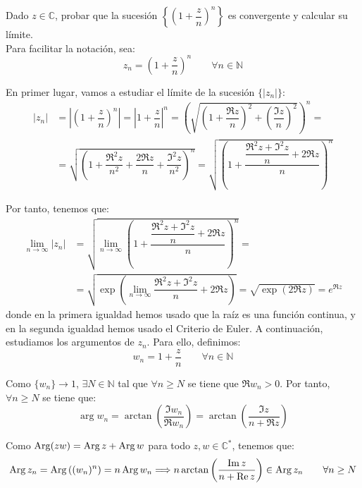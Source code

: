 \begin{ejercicio}
    Dado $z \in \mathbb{C}$, probar que la sucesión $\left\{\left(1 + \dfrac{z}{n}\right)^n\right\}$ es convergente y calcular su límite.\\

    Para facilitar la notación, sea:
    \begin{equation*}
        z_n = \left(1 + \dfrac{z}{n}\right)^n\qquad \forall n\in \mathbb{N}
    \end{equation*}

    En primer lugar, vamos a estudiar el límite de la sucesión $\{|z_n|\}$:
    \begin{align*}
        |z_n| &= \left|\left(1 + \dfrac{z}{n}\right)^n\right| = \left|1 + \dfrac{z}{n}\right|^n = \left(\sqrt{\left(1+\dfrac{\Re z}{n}\right)^2 + \left(\dfrac{\Im z}{n}\right)^2}\right)^n
        =\\&= \sqrt{\left(1 + \dfrac{\Re^2z}{n^2} + \dfrac{2\Re z}{n} + \dfrac{\Im^2 z}{n^2}\right)^{n}}
        = \sqrt{\left(1 + \dfrac{\dfrac{\Re^2z + \Im^2z}{n}+2\Re z}{n}\right)^{n}}
    \end{align*}

    Por tanto, tenemos que:
    \begin{align*}
        \lim_{n\to \infty}|z_n| &= \sqrt{\lim_{n\to \infty}\left(1 + \dfrac{\dfrac{\Re^2z + \Im^2z}{n}+2\Re z}{n}\right)^{n}}
        =\\&= \sqrt{\exp\left(\lim_{n\to \infty}\dfrac{\Re^2z + \Im^2z}{n}+2\Re z\right)}
        = \sqrt{\exp(2\Re z)} = e^{\Re z}
    \end{align*}
    donde en la primera igualdad hemos usado que la raíz es una función continua, y en la segunda igualdad hemos usado el Criterio de Euler. A continuación, estudiamos los argumentos de $z_n$. Para ello, definimos:
    \begin{equation*}
        w_n = 1 + \dfrac{z}{n}\qquad \forall n\in \mathbb{N}
    \end{equation*}

    Como $\{w_n\}\to 1$, $\exists N\in \mathbb{N}$ tal que $\forall n\geq N$ se tiene que $\Re w_n>0$. Por tanto, $\forall n\geq N$ se tiene que:
    \begin{equation*}
        \arg w_n = \arctan\left(\dfrac{\Im w_n}{\Re w_n}\right) = \arctan\left(\dfrac{\Im z}{n+\Re z}\right)
    \end{equation*}

    Como $\operatorname{Arg}(zw)=\operatorname{Arg} z + \operatorname{Arg} w$ para todo $z,w\in \mathbb{C}^{\ast}$, tenemos que:
    \begin{equation*}
        \operatorname{Arg} z_n = \operatorname{Arg} \left((w_n)^n\right) = n\operatorname{Arg} w_n \Longrightarrow
        n\arctan\left(\dfrac{\operatorname{Im} z}{n+\operatorname{Re} z}\right)\in \operatorname{Arg} z_n\qquad \forall n\geq N
    \end{equation*}


\end{ejercicio}
